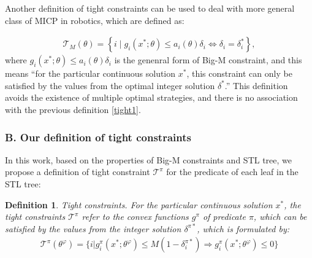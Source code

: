 \documentclass[a4paper]{report}
\newtheorem{myDef}{Definition}
\begin{document}

Another definition of tight constraints \cite[]{Cauligi2020} can be used to deal with more general class of MICP in robotics, which are defined as:

\begin{equation}
\label{tight2}%
    \begin{aligned}
        \mathcal{T}_M(\theta)=\left\{i \mid g_i\left(x^* ; \theta\right) \leq a_i(\theta) \delta_i \Longleftrightarrow \delta_i=\delta_i^*\right\},
    \end{aligned} 
\end{equation}
where $g_i(x^* ; \theta) \leq a_i(\theta) \delta_i$ is the genenral form of Big-M constraint, and this means ``for the particular continuous solution $x^*$, this constraint can only be satisfied by the values from the optimal integer solution $\delta^*$.''\cite[]{Cauligi2020} This definition avoids the existence of multiple optimal strategies, and there is no association with the previous definition \ref*{tight1}.

\subsubsection*{B. Our definition of tight constraints}
In this work, based on the properties of Big-M constraints and STL tree, we propose a definition of tight constraint $\mathcal{T}^\pi$ for the predicate of each leaf in the STL tree:

\begin{myDef} Tight constraints.
\label{tight3}%
    For the particular continuous solution $x^*$, the tight constraints $\mathcal{T}^\pi$ refer to the convex functions $g^\pi$ 
    of predicate $\pi$, which can be satisfied by the values from the integer solution $\delta^{\pi*}$, which is formulated by:
    \begin{equation}
        \begin{aligned}
            \mathcal{T}^\pi(\theta^\varphi) = \{i|g_i^\pi(x^*;\theta^\varphi) \leq M(1-\delta_i^{\pi*}) 
            \Longrightarrow 
            g_i^\pi(x^*;\theta^\varphi) \leq 0\}
        \end{aligned}
    \end{equation}
\end{myDef}
\end{document}
